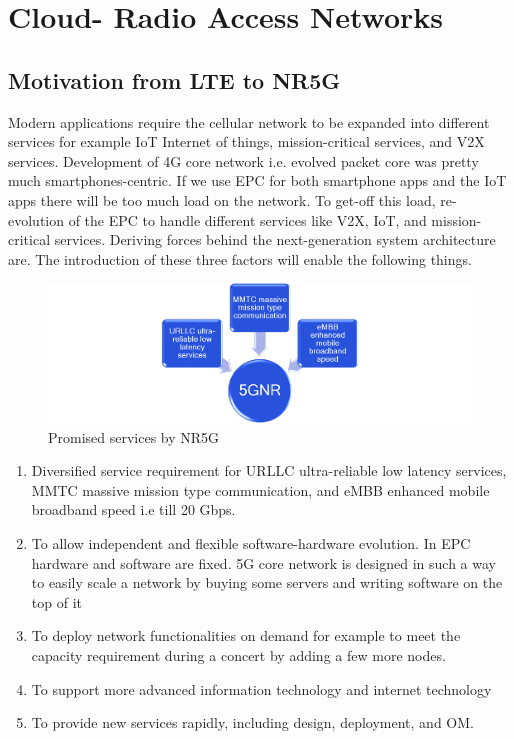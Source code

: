 \chapter{Cloud- Radio Access Networks}
\section{Motivation from LTE to NR5G} Modern applications require the cellular network to be expanded into different services for example IoT Internet of things, mission-critical services, and
V2X services. Development of 4G core network i.e. evolved packet core was
pretty much smartphones-centric. If we use EPC for both smartphone apps
and the IoT apps there will be too much load on the network. To get-off this
load, re-evolution of the EPC to handle different services like V2X, IoT, and
mission-critical services.
Deriving forces behind the next-generation system architecture are. The
introduction of these three factors will enable the following things.

\begin{figure}[h!]
\centering
\includegraphics[width=1.0\textwidth]{pic-one.png}
\caption{Promised services by NR5G }
\end{figure}

\begin{enumerate}
    \item Diversified service requirement for URLLC ultra-reliable low latency
services, MMTC massive mission type communication, and eMBB enhanced mobile broadband speed i.e till 20 Gbps.
    
    \item To allow independent and flexible software-hardware evolution. In EPC
hardware and software are fixed. 5G core network is designed in such
a way to easily scale a network by buying some servers and writing
software on the top of it
    
    \item To deploy network functionalities on demand for example to meet the
capacity requirement during a concert by adding a few more nodes.
    
    \item To support more advanced information technology and internet technology
     \item To provide new services rapidly, including design, deployment, and OM.
    \end{enumerate}

